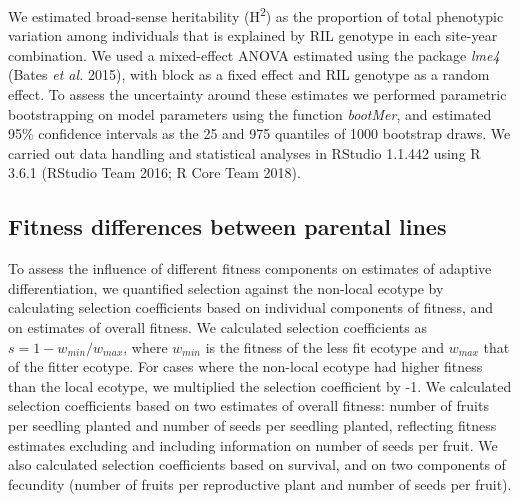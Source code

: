 \documentclass[12pt,]{article}
\begin{document}
We estimated broad-sense heritability (H\textsuperscript{2}) as the proportion of total phenotypic variation among individuals that is explained by RIL genotype in each site-year combination. We used a mixed-effect ANOVA estimated using the package \emph{lme4} (Bates \emph{et al.} 2015), with block as a fixed effect and RIL genotype as a random effect. To assess the uncertainty around these estimates we performed parametric bootstrapping on model parameters using the function \emph{bootMer}, and estimated 95\% confidence intervals as the 25 and 975 quantiles of 1000 bootstrap draws. We carried out data handling and statistical analyses in RStudio 1.1.442 using R 3.6.1 (RStudio Team 2016; R Core Team 2018).

\hypertarget{fitness-differences-between-parental-lines}{%
\subsection{Fitness differences between parental lines}\label{fitness-differences-between-parental-lines}}

To assess the influence of different fitness components on estimates of adaptive differentiation, we quantified selection against the non-local ecotype by calculating selection coefficients based on individual components of fitness, and on estimates of overall fitness. We calculated selection coefficients as \(s=1-w_{min}/w_{max}\), where \(w_{min}\) is the fitness of the less fit ecotype and \(w_{max}\) that of the fitter ecotype. For cases where the non-local ecotype had higher fitness than the local ecotype, we multiplied the selection coefficient by -1. We calculated selection coefficients based on two estimates of overall fitness: number of fruits per seedling planted and number of seeds per seedling planted, reflecting fitness estimates excluding and including information on number of seeds per fruit. We also calculated selection coefficients based on survival, and on two components of fecundity (number of fruits per reproductive plant and number of seeds per fruit).
\end{document}
